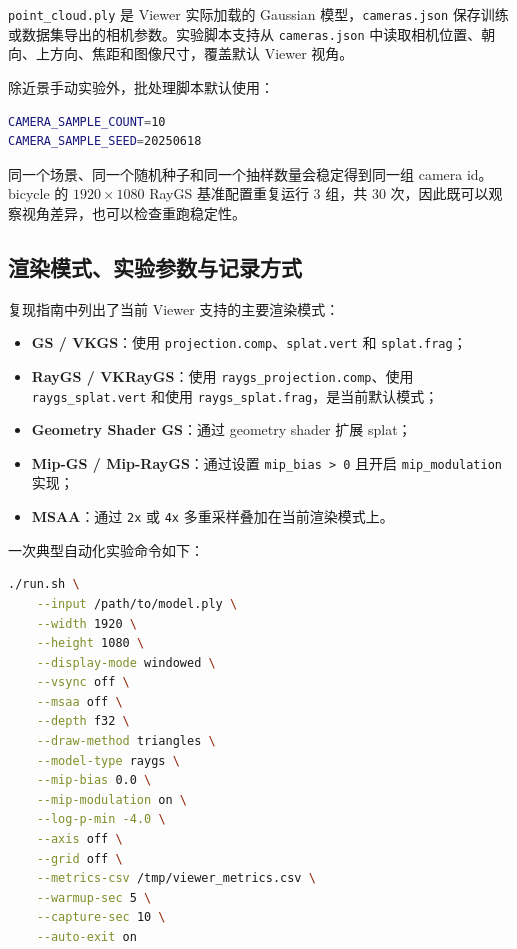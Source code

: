 \documentclass[12pt,hyperref,a4paper,UTF8]{ctexart}
\begin{document}
\texttt{point\_cloud.ply} 是 Viewer 实际加载的 Gaussian 模型，\texttt{cameras.json} 保存训练或数据集导出的相机参数。实验脚本支持从 \texttt{cameras.json} 中读取相机位置、朝向、上方向、焦距和图像尺寸，覆盖默认 Viewer 视角。

除近景手动实验外，批处理脚本默认使用：

\begin{lstlisting}[language=bash]
CAMERA_SAMPLE_COUNT=10
CAMERA_SAMPLE_SEED=20250618
\end{lstlisting}

同一个场景、同一个随机种子和同一个抽样数量会稳定得到同一组 camera id。bicycle 的 $1920\times1080$ RayGS 基准配置重复运行 3 组，共 30 次，因此既可以观察视角差异，也可以检查重跑稳定性。



\subsection{渲染模式、实验参数与记录方式}
复现指南中列出了当前 Viewer 支持的主要渲染模式：

\begin{itemize}
    \item \textbf{GS / VKGS}：使用 \texttt{projection.comp}、\texttt{splat.vert} 和 \texttt{splat.frag}；
    \item \textbf{RayGS / VKRayGS}：使用 \texttt{raygs\_projection.comp}、使用 \texttt{raygs\_splat.vert} 和使用 \texttt{raygs\_splat.frag}，是当前默认模式；
    \item \textbf{Geometry Shader GS}：通过 geometry shader 扩展 splat；
    \item \textbf{Mip-GS / Mip-RayGS}：通过设置 \texttt{mip\_bias > 0} 且开启 \texttt{mip\_modulation} 实现；
    \item \textbf{MSAA}：通过 \texttt{2x} 或 \texttt{4x} 多重采样叠加在当前渲染模式上。
\end{itemize}

一次典型自动化实验命令如下：

\begin{lstlisting}[language=bash]
./run.sh \
    --input /path/to/model.ply \
    --width 1920 \
    --height 1080 \
    --display-mode windowed \
    --vsync off \
    --msaa off \
    --depth f32 \
    --draw-method triangles \
    --model-type raygs \
    --mip-bias 0.0 \
    --mip-modulation on \
    --log-p-min -4.0 \
    --axis off \
    --grid off \
    --metrics-csv /tmp/viewer_metrics.csv \
    --warmup-sec 5 \
    --capture-sec 10 \
    --auto-exit on
\end{lstlisting}
\end{document}
